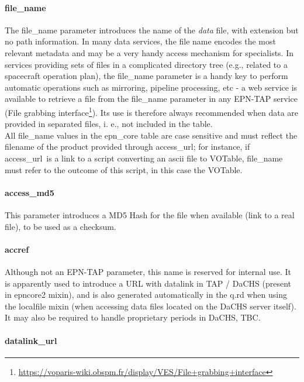 \documentclass[11pt,a4paper]{ivoa}
\begin{document}
\paragraph{file\_name}

The file\_name parameter introduces the name of the \emph{data} file, with extension but no path information. In many data services, the file name encodes the most relevant metadata and may be a very handy access mechanism for specialists. In services providing sets of files in a complicated directory tree (e.g., related to a spacecraft operation plan), the file\_name parameter is a handy key to perform automatic operations such as mirroring, pipeline processing, etc - a web service is available to retrieve a file from the file\_name parameter in any EPN-TAP service (File grabbing interface\footnote{\url{https://voparis-wiki.obspm.fr/display/VES/File+grabbing+interface}}). Its use is therefore always recommended when data are provided in separated files, i. e., not included in the table.\\All file\_name values in the epn\_core table are case sensitive and must reflect the filename of the product provided through access\_url; for instance, if access\_url is a link to a script converting an ascii file to VOTable, file\_name must refer to the outcome of this script, in this case the VOTable.

\paragraph{access\_md5}

This parameter introduces a MD5 Hash for the file when available (link to a real file), to be used as a checksum.\\

\paragraph{accref}

Although not an EPN-TAP parameter, this name is reserved for internal use. It is apparently used to introduce a URL with datalink in TAP / DaCHS (present in epncore2 mixin), and is also generated automatically in the q.rd when using the localfile mixin (when accessing data files located on the DaCHS server itself). It may also be required to handle proprietary periods in DaCHS, TBC. \\

\paragraph{datalink\_url}
\end{document}
